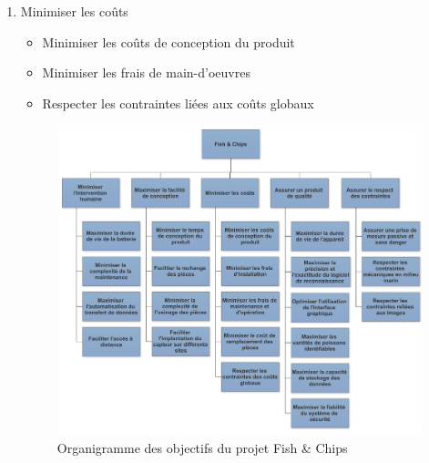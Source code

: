 \begin{enumerate}
    \item Minimiser les coûts
    \begin{itemize}
        \item Minimiser les coûts de conception du produit
        \item Minimiser les frais de main-d'oeuvres
        \item Respecter les contraintes liées aux coûts globaux
    \end{itemize}
    
    \newpage
    
    \begin{figure}
        \centering
        \includegraphics[width=1.0\linewidth]{fig/Organigramme.png}
        \caption{Organigramme des objectifs du projet Fish \& Chips}
        \label{fig:organigramme}
    \end{figure}
    
    
\end{enumerate}
